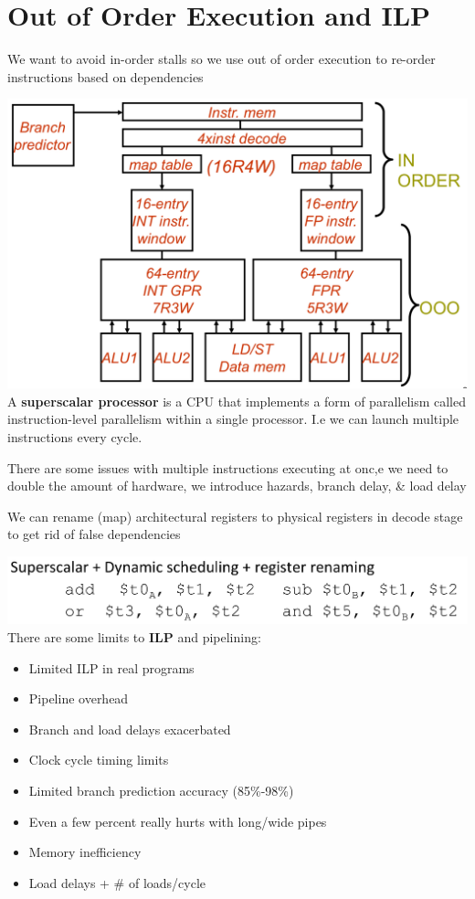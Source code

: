 \section{Out of Order Execution and ILP}
We want to avoid in-order stalls so we use out of order execution to re-order
instructions based on dependencies

\includegraphics[width=\linewidth]{png/ooo.png}
A \textbf{superscalar processor} is a CPU that implements a form of parallelism
called instruction-level parallelism within a single processor. I.e we can launch
multiple instructions every cycle.

There are some issues with multiple instructions executing at onc,e we need to
double the amount of hardware, we introduce hazards, branch delay, \& load delay

We can rename (map) architectural registers to physical registers in decode stage
to get rid of false dependencies

\includegraphics[width=\linewidth]{png/super.png}
There are some limits to \textbf{ILP} and pipelining:
\begin{itemize}
    \item Limited ILP in real programs
    \item Pipeline overhead
    \item Branch and load delays exacerbated
    \item Clock cycle timing limits
    \item Limited branch prediction accuracy (85\%-98\%)
    \item Even a few percent really hurts with long/wide pipes
    \item Memory inefficiency
    \item Load delays + \# of loads/cycle
\end{itemize}
